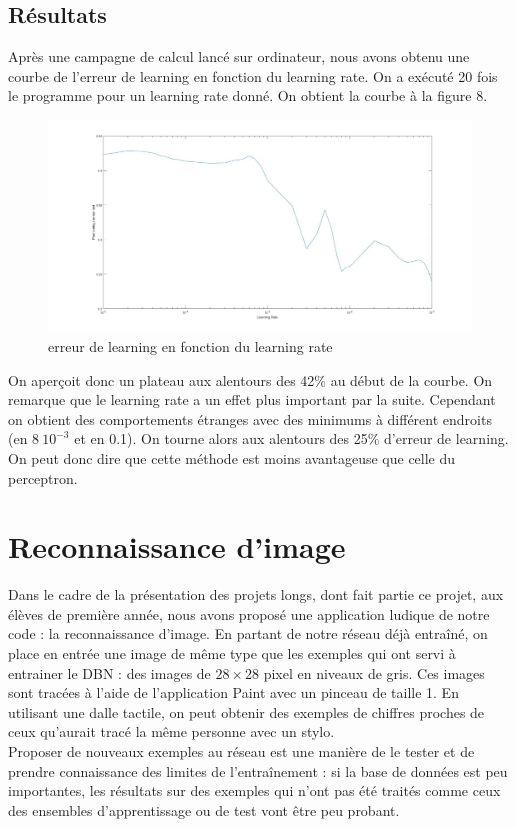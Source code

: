 \documentclass[a4paper,oneside]{report}
\begin{document}
\subsection{Résultats}

Après une campagne de calcul lancé sur ordinateur, nous avons obtenu une courbe de l'erreur de learning en fonction du learning rate. On a exécuté 20 fois le programme pour un learning rate donné. On obtient la courbe à la figure 8.

\begin{figure}[!h]
	\begin{center}
		\includegraphics[scale=0.27]{Images/courbe_discriminative.jpg} 
	\end{center}
\caption{erreur de learning en fonction du learning rate} 
\end{figure}

On aperçoit donc un plateau aux alentours des 42\% au début de la courbe. On remarque que le learning rate a un effet plus important par la suite. Cependant on obtient des comportements étranges avec des minimums à différent endroits (en $8 \ 10^{-3}$ et en 0.1). On tourne alors aux alentours des 25\% d'erreur de learning. On peut donc dire que cette méthode est moins avantageuse que celle du perceptron.\\

\newpage

\section{Reconnaissance d'image}

Dans le cadre de la présentation des projets longs, dont fait partie ce projet, aux élèves de première année, nous avons proposé une application ludique de notre code : la reconnaissance d'image. En partant de notre réseau déjà entraîné, on place en entrée une image de même type que les exemples qui ont servi à entrainer le DBN : des images de $28 \times 28$ pixel en niveaux de gris. Ces images sont tracées à l'aide de l'application Paint avec un pinceau de taille 1. En utilisant une dalle tactile, on peut obtenir des exemples de chiffres proches de ceux qu'aurait tracé la même personne avec un stylo.\\
Proposer de nouveaux exemples au réseau est une manière de le tester et de prendre connaissance des limites de l'entraînement : si la base de données est peu importantes, les résultats sur des exemples qui n'ont pas été traités comme ceux des ensembles d'apprentissage ou de test vont être peu probant.\\
\end{document}
